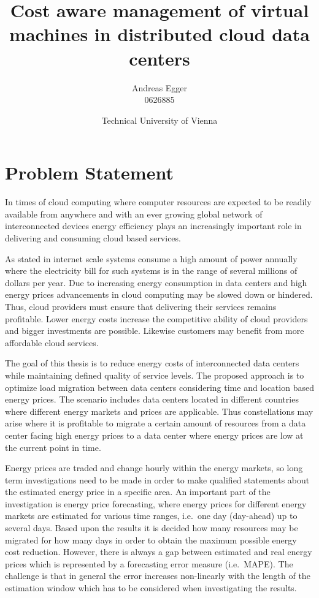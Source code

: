 \documentclass[a4paper]{article}
\title{Cost aware management of virtual machines in distributed cloud data centers}
\author{Andreas Egger \\0626885}
\date{Technical University of Vienna}
\begin{document}
\maketitle


\section{Problem Statement}

In times of cloud computing where computer resources are expected to be readily available from anywhere \cite{buyya2009cloud} and with an ever growing global network of interconnected devices energy efficiency plays an increasingly important role in delivering and consuming cloud based services. 

As stated in \cite{qureshi2009cutting} internet scale systems consume a high amount of power annually where the electricity bill for such systems is in the range of several millions of dollars per year. Due to increasing energy consumption in data centers and high energy prices advancements in cloud computing may be slowed down or hindered. Thus, cloud providers must ensure that delivering their services remains profitable. Lower energy costs increase the competitive ability of cloud providers and bigger investments are possible. Likewise customers may benefit from more affordable cloud services. 


The goal of this thesis is to reduce energy costs of interconnected data centers while maintaining defined quality of service levels. The proposed approach is to optimize load migration between data centers considering time and location based energy prices. The scenario includes data centers located in different countries where different energy markets and prices are applicable. Thus constellations may arise where it is profitable to migrate a certain amount of resources from a data center facing high energy prices to a data center where energy prices are low at the current point in time. 

Energy prices are traded and change hourly within the energy markets, so long term investigations need to be made in order to make qualified statements about the estimated energy price in a specific area.
An important part of the investigation is energy price forecasting, where energy prices for different energy markets are estimated for various time ranges, i.e.\ one day (day-ahead) up to several days. Based upon the results it is decided how many resources may be migrated for how many days in order to obtain the maximum possible energy cost reduction. However, there is always a gap between estimated and real energy prices which is represented by a forecasting error measure (i.e.\ MAPE). The challenge is that in general the error increases non-linearly with the length of the estimation window which has to be considered when investigating the results. 
\end{document}
